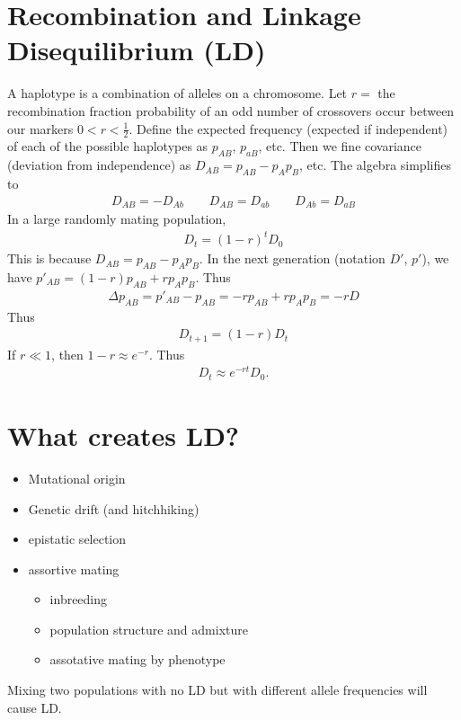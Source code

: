\documentclass{article}
\begin{document}
    \section{Recombination and Linkage Disequilibrium (LD)}
        A haplotype is a combination of alleles on a chromosome.  Let $r = $ the recombination fraction probability of an odd number of crossovers occur between our markers $0 < r < \frac{1}{2}$.  Define the expected frequency (expected if independent) of each of the possible haplotypes as $p_{AB}$, $p_{aB}$, etc.  Then we fine covariance (deviation from independence) as $D_{AB} = p_{AB} - p_Ap_B$, etc.  The algebra simplifies to
        \begin{align}
            D_{AB} = -D_{Ab} \qquad D_{AB} = D_{ab} \qquad D_{Ab} = D_{aB}
        \end{align}
        In a large randomly mating population,
        \begin{align}
            D_t = (1 - r)^tD_0
        \end{align}
        This is because $D_{AB} = p_{AB} - p_Ap_B$.  In the next generation (notation $D'$, $p'$), we have $p'_{AB} = (1 - r)p_{AB} + rp_Ap_B$.  Thus
        \begin{align}
            \Delta p_{AB} = p'_{AB} - p_{AB} = -rp_{AB} + rp_Ap_B = -rD
        \end{align}
        Thus
        \begin{align}
            D_{t+1} = (1 - r)D_t
        \end{align}
        If $r \ll 1$, then $1 - r \approx e^{-r}$.  Thus
        \begin{align}
            D_t \approx e^{-rt}D_0.
        \end{align}

    \section{What creates LD?}
        \begin{itemize}
            \item Mutational origin
            \item Genetic drift (and hitchhiking)
            \item epistatic selection
            \item assortive mating
            \begin{itemize}
                \item inbreeding
                \item population structure and admixture
                \item assotative mating by phenotype
            \end{itemize}
        \end{itemize}
        Mixing two populations with no LD but with different allele frequencies will cause LD.
\end{document}
